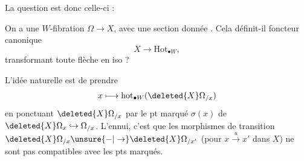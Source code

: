 La question est donc celle-ci :

On a une $W$-fibration $\Omega\longrightarrow X$, avec une section donnée \inserted{$\sigma$}. Cela définit-il  foncteur canonique
\[
X\longrightarrow\mathrm{Hot}_{\bullet W},
\]
transformant toute flèche en iso ? 

 L'idée naturelle est de prendre
\[
x\longmapsto\mathrm{hot}_{\bullet W}(\deleted{X}\Omega_{/x})
\]
en ponctuant $\deleted{X}\Omega_{/x}$ par le pt marqué $\sigma(x)$ de $\deleted{X}\Omega_x\hookrightarrow\Omega_{/x}$. L'ennui, c'est que les morphismes de transition $\deleted{X}\Omega_{/x}\unsure{-|\to}\deleted{X}\Omega_{/x'}$ (pour $x\xrightarrow{u}x'$ dans $X$) ne sont pas compatibles avec les pts marqués.


